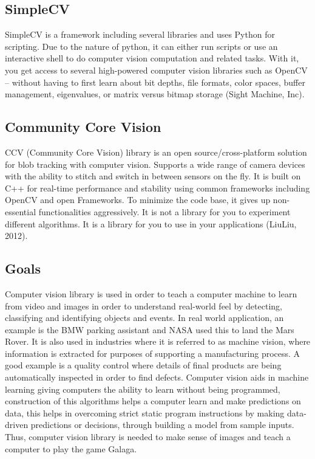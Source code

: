 \documentclass{scrreprt}
\begin{document}
\subsection{SimpleCV}
SimpleCV is a framework including several libraries and uses Python for scripting.
Due to the nature of python, it can either run scripts or use an interactive shell to do computer vision computation and related tasks.
With it, you get access to several high-powered computer vision libraries such as OpenCV – without having to first learn about bit depths,
file formats, color spaces, buffer management, eigenvalues, or matrix versus bitmap storage (Sight Machine, Inc).
\subsection{Community Core Vision}
CCV (Community Core Vision) library is an open source/cross-platform solution for blob tracking with computer vision.
Supports a wide range of camera devices with the ability to stitch and switch in between sensors on the fly.
It is built on C++ for real-time performance and stability using common frameworks including OpenCV and open Frameworks.
To minimize the code base, it gives up non-essential functionalities aggressively.
It is not a library for you to experiment different algorithms.
It is a library for you to use in your applications (LiuLiu, 2012).

\subsection{Goals}
Computer vision library is used in order to teach a computer machine to learn from video and images in order to understand real-world feel by detecting,
classifying and identifying objects and events.
In real world application, an example is the BMW parking assistant and NASA used this to land the Mars Rover.
It is also used in industries where it is referred to as machine vision, where information is extracted for purposes of supporting a manufacturing process.
A good example is a quality control where details of final products are being automatically inspected in order to find defects.
Computer vision aids in machine learning giving computers the ability to learn without being programmed,
construction of this algorithms helps a computer learn and make predictions on data,
this helps in overcoming strict static program instructions by making data-driven predictions or decisions,
through building a model from sample inputs.
Thus, computer vision library is needed to make sense of images and teach a computer to play the game Galaga.
\end{document}
